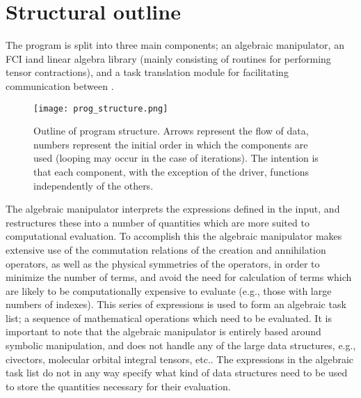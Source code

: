 \section{Structural outline}
\noindent The program is split into three main components; an algebraic manipulator, an FCI
iand linear algebra library (mainly consisting of routines for performing tensor contractions),
and a task translation module for facilitating communication between .\\

\begin{figure}[!ht]
\begin{center}
\texttt{[image: prog\_structure.png]}
\caption{ Outline of program structure. Arrows represent the flow of data, numbers represent the
initial order in which the components are used (looping may occur in the case of iterations).
The intention is that each component, with the exception of the driver, functions independently of the others.}
\end{center}
\label{fig:prog_structure}
\end{figure}

\noindent The algebraic manipulator interprets the expressions defined
in the input, and restructures these into a number of quantities which are
more suited to computational evaluation. To accomplish this the
algebraic manipulator makes extensive use of the commutation
relations of the creation and annihilation operators, as well as the physical
symmetries of the operators, in order to minimize the number of terms, and
avoid the need for calculation of terms which are likely to be computationally
expensive to evaluate (e.g., those with large numbers of indexes). This series
of expressions is used to form an algebraic task list; a sequence of
mathematical operations which need to be evaluated.  It is important to note
that the algebraic manipulator is entirely based around symbolic manipulation,
and does not handle any of the large data structures, e.g., civectors,
molecular orbital integral tensors, etc.. The expressions in the algebraic
task list do not in any way specify what kind of data structures need to
be used to store the quantities necessary for their evaluation.\\

